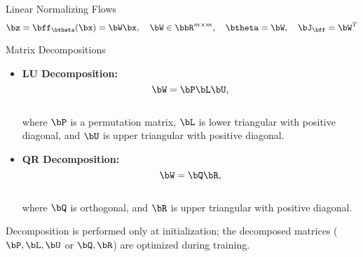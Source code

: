 \documentclass{beamer}
\begin{document}
\begin{frame}{Linear Normalizing Flows}
	\vspace{-0.3cm}
	\[
		\bz = \bff_{\btheta}(\bx) = \bW \bx, \quad \bW \in \bbR^{m \times m}, \quad \btheta = \bW, \quad \bJ_\bff = \bW^T
	\]
	\vspace{-0.7cm}
	\eqpause
	\begin{block}{Matrix Decompositions}
		\begin{itemize}
			\item \textbf{LU Decomposition:}
			\vspace{-0.3cm}
			\[
				\bW = \bP \bL \bU,
			\]
			\vspace{-0.7cm} \\
			where $\bP$ is a permutation matrix, $\bL$ is lower triangular with positive diagonal, and $\bU$ is upper triangular with positive diagonal.
			\eqpause
			\item \textbf{QR Decomposition:}
			\vspace{-0.3cm}
			\[
				\bW = \bQ \bR,
			\]
			\vspace{-0.7cm} \\
			where $\bQ$ is orthogonal, and $\bR$ is upper triangular with positive diagonal.
		\end{itemize}
	\end{block}
    \eqpause
	Decomposition is performed only at initialization; the decomposed matrices ($\bP, \bL, \bU$ or $\bQ, \bR$) are optimized during training.

\end{frame}
\end{document}
